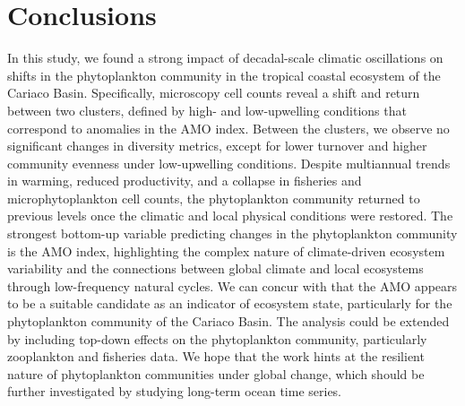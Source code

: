 \documentclass[draft]{agujournal2019}
\begin{document}
\section{Conclusions}
In this study, we found a strong impact of decadal-scale climatic oscillations on shifts in the phytoplankton community in the tropical coastal ecosystem of the Cariaco Basin. Specifically, microscopy cell counts reveal a shift and return between two clusters, defined by high- and low-upwelling conditions that correspond to anomalies in the AMO index. Between the clusters, we observe no significant changes in diversity metrics, except for lower turnover and higher community evenness under low-upwelling conditions.
Despite multiannual trends in warming, reduced productivity, and a collapse in fisheries and microphytoplankton cell counts, the phytoplankton community returned to previous levels once the climatic and local physical conditions were restored. 
The strongest bottom-up variable predicting changes in the phytoplankton community is the AMO index, highlighting the complex nature of climate-driven ecosystem variability and the connections between global climate and local ecosystems through low-frequency natural cycles. We can concur with  that the AMO appears to be a suitable candidate as an indicator of ecosystem state, particularly for the phytoplankton community of the Cariaco Basin. 
The analysis could be extended by including top-down effects on the phytoplankton community, particularly zooplankton and fisheries data. 
We hope that the work hints at the resilient nature of phytoplankton communities under global change, which should be further investigated by studying long-term ocean time series.









%
%
\end{document}
